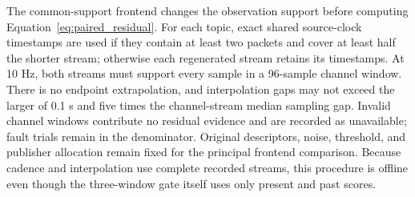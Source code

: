The common-support frontend changes the observation support before computing Equation~\eqref{eq:paired_residual}. For each topic, exact shared source-clock timestamps are used if they contain at least two packets and cover at least half the shorter stream; otherwise each regenerated stream retains its timestamps. At 10 Hz, both streams must support every sample in a 96-sample channel window. There is no endpoint extrapolation, and interpolation gaps may not exceed the larger of 0.1 s and five times the channel-stream median sampling gap. Invalid channel windows contribute no residual evidence and are recorded as unavailable; fault trials remain in the denominator. Original descriptors, noise, threshold, and publisher allocation remain fixed for the principal frontend comparison. Because cadence and interpolation use complete recorded streams, this procedure is offline even though the three-window gate itself uses only present and past scores.
